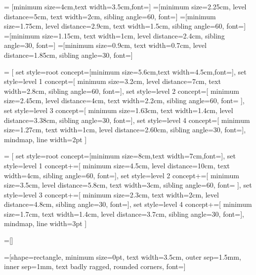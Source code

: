 =   [minimum size=4cm,text width=3.5cm,font=\large]
=[minimum size=2.25cm,
                             level distance=5cm,
                             text width=2cm,
                             sibling angle=60,
                             font=\small]
=[minimum size=1.75cm,%
                             level distance=2.9cm,%
                             text width=1.5cm,%
                             sibling angle=60,%
                             font=\footnotesize]
=[minimum size=1.15cm,%
                             text width=1cm,%
                             level distance=2.4cm,%
                             sibling angle=30,%
                             font=\tiny]
=[minimum size=0.9cm,%
                             text width=0.7cm,
                             level distance=1.85cm,%
                             sibling angle=30,%
                             font=\tiny]
  
=
  [%
  set style={{root concept}=[minimum size=5.6cm,text width=4.5cm,font=\Large]},
  set style={{level 1 concept}=[%
    minimum size=3.2cm,
    level distance=7cm,
    text width=2.8cm,
    sibling angle=60,
    font=]},%
  set style={{level 2 concept}=[%
    minimum size=2.45cm,%
    level distance=4cm,%
    text width=2.2cm,%
    sibling angle=60,%
    font=\small%
    ]},%
  set style={{level 3 concept}=[%
    minimum size=1.63cm,%
    text width=1.4cm,%
    level distance=3.38cm,%
    sibling angle=30,%
    font=\scriptsize]},%
  set style={{level 4 concept}=[%
    minimum size=1.27cm,%
    text width=1cm,
    level distance=2.60cm,%
    sibling angle=30,%
    font=\tiny]},%
  mindmap,%
  line width=2pt
  ]
  
=
  [%
  set style={{root concept}=[minimum size=8cm,text width=7cm,font=\huge]},
  set style={{level 1 concept}+=[%
    minimum size=4.5cm,
    level distance=10cm,
    text width=4cm,
    sibling angle=60,
    font=\large]},%
  set style={{level 2 concept}+=[%
    minimum size=3.5cm,%
    level distance=5.8cm,%
    text width=3cm,%
    sibling angle=60,%
    font=%
    ]},%
  set style={{level 3 concept}+=[%
    minimum size=2.3cm,%
    text width=2cm,%
    level distance=4.8cm,%
    sibling angle=30,%
    font=\footnotesize]},%
  set style={{level 4 concept}+=[%
    minimum size=1.7cm,%
    text width=1.4cm,
    level distance=3.7cm,%
    sibling angle=30,%
    font=\scriptsize]},%
  mindmap,%
  line width=3pt
  ]
  
=[]


=[shape=rectangle,
                        minimum size=0pt,
                        text width=3.5cm,
                        outer sep=1.5mm,
                        inner sep=1mm,
                        text badly ragged,
                        rounded corners,
                        font=\tiny]

\endinput

